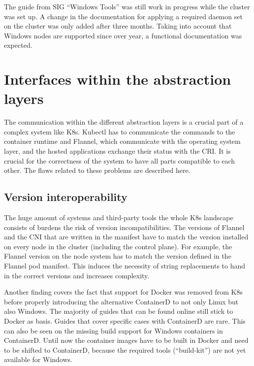The guide from \ac{SIG} \enquote{Windows Tools} was still work in progress while the cluster was set up. A change in the documentation for applying a required daemon set on the cluster was only added after three months. Taking into account that Windows nodes are supported since over year, a functional documentation was expected.

\section{Interfaces within the abstraction layers}
The communication within the different abstraction layers is a crucial part of a complex system like \ac{K8s}. Kubectl has to communicate the commands to the container runtime and Flannel, which communicate with the operating system layer, and the hosted applications exchange their status with the \ac{CRI}. 
It is crucial for the correctness of the system to have all parts compatible to each other. The flaws related to these problems are described here. 

\subsection{Version interoperability}
The huge amount of systems and third-party tools the whole \ac{K8s} landscape consists of burdens the risk of version incompatibilities. 
The versions of Flannel and the \ac{CNI} that are written in the manifest have to match the version installed on every node in the cluster (including the control plane). For example, the Flannel version on the node system has to match the version defined in the Flannel pod manifest. This induces the necessity of string replacements to hand in the correct versions and increases complexity.

Another finding covers the fact that support for Docker was removed from \ac{K8s} before properly introducing the alternative ContainerD to not only Linux but also \ac{Windows}. The majority of guides that can be found online still stick to Docker as basis. Guides that cover specific cases with ContainerD are rare.
This can also be seen on the missing build support for \ac{Windows} containers in ContainerD. Until now the container images have to be built in Docker and need to be shifted to ContainerD, because the required tools (\enquote{build-kit}) are not yet available for \ac{Windows}\cite{Microsoft.20221225}.

